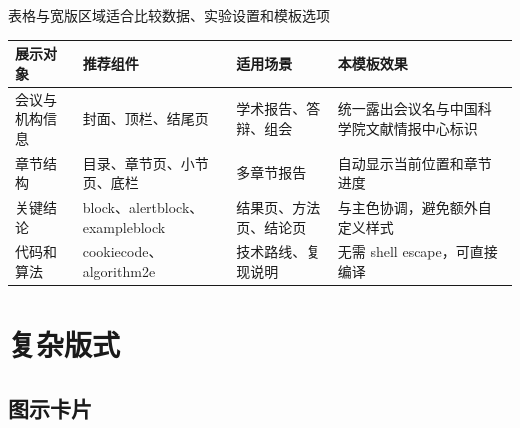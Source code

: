 \documentclass[aspectratio=169]{beamer}
\begin{document}
\begin{frame}{表格与宽版区域}{适合比较数据、实验设置和模板选项}
  \begin{wide}
    \begin{table}
      \centering
      \begin{tabularx}{.91\paperwidth}{lXXX}
        \toprule
        展示对象 & 推荐组件 & 适用场景 & 本模板效果 \\
        \midrule
        会议与机构信息 & 封面、顶栏、结尾页 & 学术报告、答辩、组会 & 统一露出会议名与中国科学院文献情报中心标识 \\
        章节结构 & 目录、章节页、小节页、底栏 & 多章节报告 & 自动显示当前位置和章节进度 \\
        关键结论 & block、alertblock、exampleblock & 结果页、方法页、结论页 & 与主色协调，避免额外自定义样式 \\
        代码和算法 & cookiecode、algorithm2e & 技术路线、复现说明 & 无需 shell escape，可直接编译 \\
        \bottomrule
      \end{tabularx}
    \end{table}
  \end{wide}
\end{frame}

\section{复杂版式}
\subsection{图示卡片}
\end{document}
